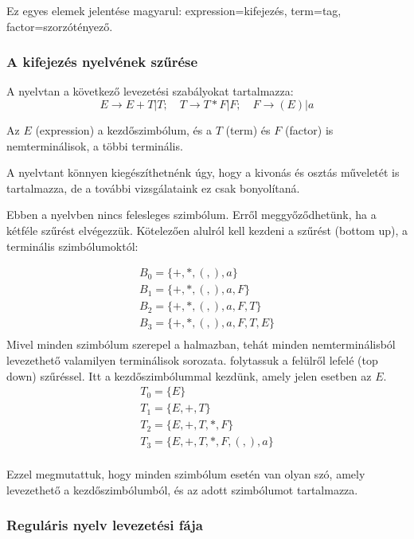 \documentclass[a4paper]{article}
\begin{document}
Ez egyes elemek jelentése magyarul: expression=kifejezés, term=tag,
factor=szorzótényező.


\subsubsection{A kifejezés nyelvének szűrése}

A nyelvtan a következő levezetési szabályokat tartalmazza:
\[
 E\rightarrow E+T | T;\quad T\rightarrow T*F| F;\quad F\rightarrow (E)|a
\]

Az $E$ (expression) a kezdőszimbólum, és a $T$ (term) és $F$ (factor) is
nemterminálisok, a többi terminális.

A nyelvtant könnyen kiegészíthetnénk úgy, hogy a kivonás és osztás
műveletét is tartalmazza, de a további vizsgálataink ez csak
bonyolítaná.

Ebben a nyelvben nincs felesleges szimbólum. Erről meggyőződhetünk, ha a
kétféle szűrést elvégezzük. Kötelezően alulról kell kezdeni a szűrést
(bottom up), a
terminális szimbólumoktól:

\begin{eqnarray*}
    B_0 = \{+, *, (, ), a\} \\
    B_1 = \{+, *, (, ), a, F\} \\
    B_2 = \{+, *, (, ), a, F, T\} \\
    B_3 = \{+, *, (, ), a, F, T, E\} \\
\end{eqnarray*}
Mivel minden szimbólum szerepel a halmazban, tehát minden
nemterminálisból levezethető valamilyen terminálisok sorozata.
folytassuk a felülről lefelé (top down) szűréssel. Itt a
kezdőszimbólummal kezdünk, amely jelen esetben az $E$.
\begin{eqnarray*}
    T_0 = \{E\} \\
    T_1 = \{E, +, T\} \\
    T_2 = \{E, +, T, *, F\} \\
    T_3 = \{E, +, T, *, F, (, ), a\} \\
\end{eqnarray*}

Ezzel megmutattuk, hogy minden szimbólum esetén van olyan szó, amely
levezethető a kezdőszimbólumból, és az adott szimbólumot tartalmazza.

\subsubsection{Reguláris nyelv levezetési fája}
\end{document}
